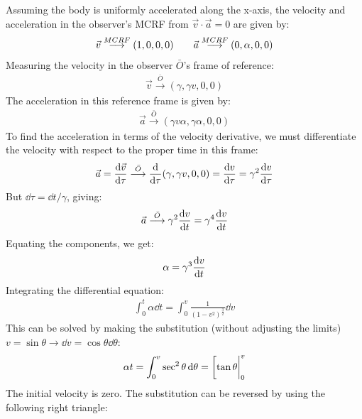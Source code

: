 \documentclass{report}
\begin{document}
\begin{subquests}
\begin{subquests}
		\item
		Assuming the body is uniformly accelerated along the x-axis, the velocity and acceleration in the observer's MCRF from $\vec v \cdot \vec a = 0$ are given by:
		\begin{gather*}
			\vec v \stackrel{MCRF}{\longrightarrow}(1, 0, 0, 0) \hspace{20 pt} \vec a \stackrel{MCRF}{\longrightarrow}(0, \alpha, 0, 0)
		\end{gather*}
		Measuring the velocity in the observer $\bar O$'s frame of reference:
		\begin{gather*}
			\vec v \stackrel{\bar O}{\longrightarrow}(\gamma, \gamma v, 0, 0)
		\end{gather*}
		The acceleration in this reference frame is given by:
		\begin{gather*}
			\vec a \stackrel{\bar O}{\longrightarrow}(\gamma v \alpha, \gamma \alpha, 0, 0) 
		\end{gather*}
		To find the acceleration in terms of the velocity derivative, we must differentiate the velocity with respect to the proper time in this frame:
		\begin{gather*}
			\vec a = \dv{\vec v}{\tau} \stackrel{\bar O}{\longrightarrow}
			\dv{\tau}(\gamma, \gamma v, 0, 0) = 
			\dv{v}{\tau}(v\gamma^{3}, v^{2}\gamma^{3} + \gamma, 0, 0) =
			\gamma^2\dv{v}{\tau}(v, 1, 0, 0)
		\end{gather*}
		But $\dd{\tau} = \dd{t}/\gamma$, giving:
		\begin{gather*}
			\vec a \stackrel{\bar O}{\longrightarrow}\gamma^{2}\dv{v}{t}(v\gamma^{2}, v^{2}\gamma^{2} + 1, 0, 0) =
			\gamma^{4}\dv{v}{t}(v, 1, 0, 0)
		\end{gather*}
		Equating the components, we get:
		\begin{gather*}
			\alpha = \gamma^{3}\dv{v}{t}
		\end{gather*}
		Integrating the differential equation:
		\begin{gather*}
			\int^{t}_{0} \alpha \dd{t} = \int^v_0 \frac{1}{(1-v^{2})^{\frac{3}{2}}} \dd{v} 
		\end{gather*}
		This can be solved by making the substitution (without adjusting the limits) $v = \sin \theta \rightarrow \dd{v} = \cos\theta\dd{\theta}$:
		\begin{gather*}
			\alpha t = \int^v_0 \sec^{2}\theta\dd{\theta} = \eval[\tan\theta|^v_0
		\end{gather*}
		The initial velocity is zero. The substitution can be reversed by using the following right triangle: \\

\end{subquests}
\end{subquests}
\end{document}
